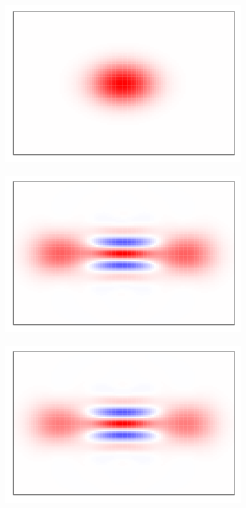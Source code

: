 \begin{figure}[t]
     \centering
     \begin{subfigure}[b]{0.30\textwidth}
         \centering
         \includegraphics[width=\textwidth]{figures/ground.pdf}
         \caption{}
         \label{fig:ground}
     \end{subfigure}
     \hfill
     \begin{subfigure}[b]{0.30\textwidth}
         \centering
         \includegraphics[width=\textwidth]{figures/initialized_cat.pdf}
         \caption{}
         \label{fig:initialized_cat}
     \end{subfigure}
     \hfill
     \begin{subfigure}[b]{0.30\textwidth}
         \centering
         \includegraphics[width=\textwidth]{figures/ideal_cat.pdf}

\end{subfigure}
\end{figure}
